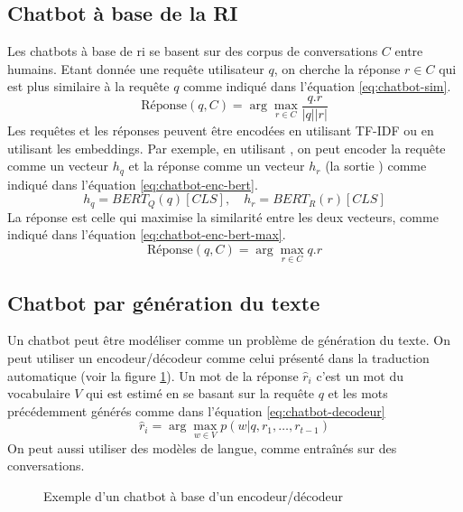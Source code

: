 \documentclass{KodeBook}
\begin{document}
\subsection{Chatbot à base de la RI}

Les chatbots à base de \ac{ri} se basent sur des corpus de conversations $C$ entre humains. 
Etant donnée une requête utilisateur $q$, on cherche la réponse $r \in C$ qui est plus similaire à la requête $q$ comme indiqué dans l'équation \ref{eq:chatbot-sim}.
\begin{equation}\label{eq:chatbot-sim}
\text{Réponse}(q, C) = \arg\max_{r \in C} \frac{q . r}{|q| |r|}
\end{equation}
Les requêtes et les réponses peuvent être encodées en utilisant TF-IDF ou en utilisant les embeddings.
Par exemple, en utilisant , on peut encoder la requête comme un vecteur $h_q$ et la réponse comme un vecteur $h_r$ (la sortie \keyword{[CLS]}) comme indiqué dans l'équation \ref{eq:chatbot-enc-bert}.
\begin{equation}\label{eq:chatbot-enc-bert}
h_q = BERT_Q(q)[CLS],\quad h_r = BERT_R(r)[CLS]
\end{equation} 
La réponse est celle qui maximise la similarité entre les deux vecteurs, comme indiqué dans l'équation \ref{eq:chatbot-enc-bert-max}.
\begin{equation}\label{eq:chatbot-enc-bert-max}
\text{Réponse}(q, C) = \arg\max_{r \in C} q . r
\end{equation}

\subsection{Chatbot par génération du texte}

Un chatbot peut être modéliser comme un problème de génération du  texte. 
On peut utiliser un encodeur/décodeur comme celui présenté dans la traduction automatique (voir la figure \ref{fig:chatbot-encdec}).
Un mot de la réponse $\hat{r}_i$ c'est un mot du vocabulaire $V$ qui est estimé en se basant sur la requête $q$ et les mots précédemment générés comme dans l'équation \ref{eq:chatbot-decodeur}
\begin{equation}\label{eq:chatbot-decodeur}
\hat{r}_i = \arg\max_{w \in V} p(w| q, r_1, \ldots, r_{t-1})
\end{equation}
On peut aussi utiliser des modèles de langue, comme  entraînés sur des conversations.

\begin{figure}[!ht]
	\centering
	\caption{Exemple d'un chatbot à base d'un encodeur/décodeur \cite{2020-jurafsky-martin}}
	\label{fig:chatbot-encdec}
\end{figure}
\end{document}
